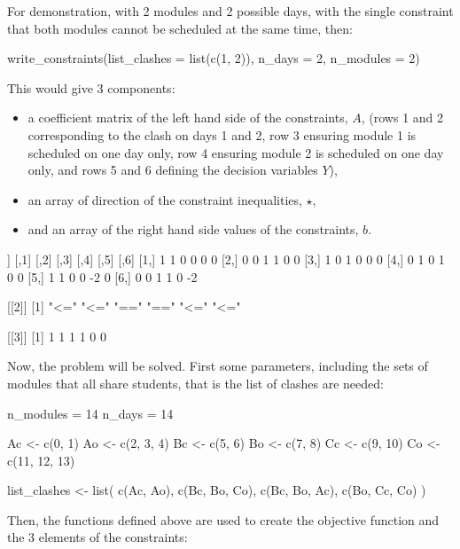 For demonstration, with 2 modules and 2 possible days, with the single
constraint that both modules cannot be scheduled at the same time, then:

\begin{Rin-no-test}
write_constraints(list_clashes = list(c(1, 2)),
                  n_days = 2,
                  n_modules = 2)
\end{Rin-no-test}

This would give 3 components:

\begin{itemize}
  \item a coefficient matrix of the left hand side of the constraints, \(A\), (rows 1
  and 2 corresponding to the clash on days 1 and 2, row 3 ensuring module 1 is
  scheduled on one day only, row 4 ensuring module 2 is scheduled on one day
  only, and rows 5 and 6 defining the decision variables \(Y\)),
  \item an array of direction of the constraint inequalities, \(\star\),
  \item and an array of the right hand side values of the constraints, \(b\).
\end{itemize}

\begin{Rout-no-test}
[[1]]
     [,1] [,2] [,3] [,4] [,5] [,6]
[1,]    1    1    0    0    0    0
[2,]    0    0    1    1    0    0
[3,]    1    0    1    0    0    0
[4,]    0    1    0    1    0    0
[5,]    1    1    0    0   -2    0
[6,]    0    0    1    1    0   -2

[[2]]
[1] "<=" "<=" "==" "==" "<=" "<="

[[3]]
[1] 1 1 1 1 0 0
\end{Rout-no-test}

Now, the problem will be solved.
First some parameters, including the sets of modules that all share
students, that is the list of clashes are needed:

\begin{Rin-no-test}
n_modules = 14
n_days = 14

Ac <- c(0, 1)
Ao <- c(2, 3, 4)
Bc <- c(5, 6)
Bo <- c(7, 8)
Cc <- c(9, 10)
Co <- c(11, 12, 13)

list_clashes <- list(
  c(Ac, Ao),
  c(Bc, Bo, Co),
  c(Bc, Bo, Ac),
  c(Bo, Cc, Co)
)
\end{Rin-no-test}

Then, the functions defined above are used to create the objective function and
the 3 elements of the constraints:

